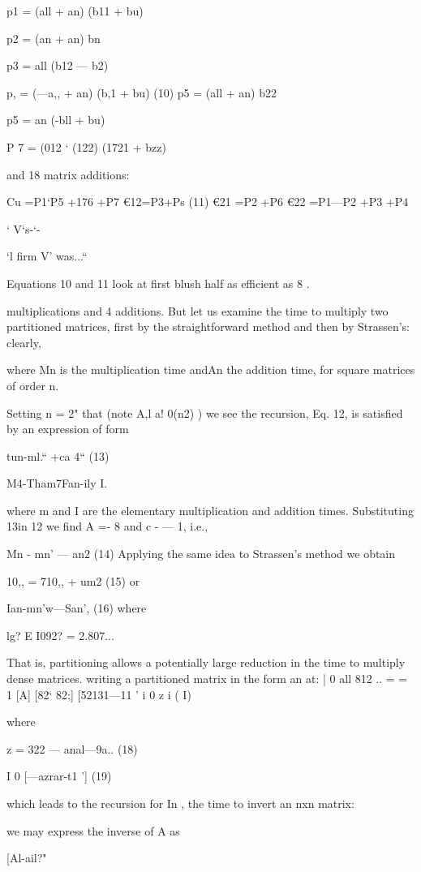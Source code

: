 {{{{{{{{{{{{{{{{{{p1 = (all + an) (b11 + bu)

p2 = (an + an) bn

p3 = all (b12 — b2)

p, = (—a,, + an) (b,1 + bu) (10)
p5 = (all + an) b22

p5 = an (-bll + bu)

P 7 = (012 ‘ (122) (1721 + bzz)

and 18 matrix additions:

Cu =P1‘P5 +176 +P7
€12=P3+Ps
(11)
€21 =P2 +P6
€22 =P1—P2 +P3 +P4

‘ V‘s-‘-

‘l firm V' was...“

Equations 10 and 11 look at first blush half as efficient as 8 .

multiplications and 4 additions. But let us examine the time to
multiply two partitioned matrices, first by the straightforward
method and then by Strassen's: clearly,

where Mn is the multiplication time andAn the addition time, for
square matrices of order n.

Setting n = 2" that (note A,l a! 0(n2) ) we see the recursion,
Eq. 12, is satisfied by an expression of form

tun-ml.“ +ca 4“ (13)

M4-Tham7Fan-ily I.

where m and I are the elementary multiplication and addition
times. Substituting 13in 12 we find A =- 8 and c - — 1, i.e.,

Mn - mn’ — an2 (14)
Applying the same idea to Strassen’s method we obtain

10,, = 710,, + um2 (15)
or

Ian-mn’w—San’, (16)
where

lg? E I092? = 2.807...

That is, partitioning allows a potentially large reduction in the
time to multiply dense matrices.
 writing a partitioned matrix in the form
an at: | 0 all 812 ..
= = 1
[A] [82‘ 82;] [52131—11 ' i 0 z i ( I)

where

 

z = 322 — anal—9a.. (18)

I 0
[—azrar-t1 '] (19)

which leads to the recursion for In , the time to invert an nxn
matrix:

we may express the inverse of A as

[Al-ail?"

}}}}}}}}}}}}}}}}}}
